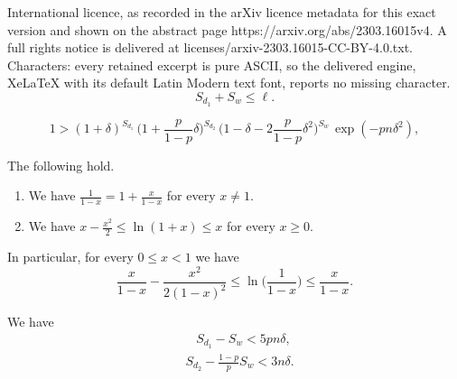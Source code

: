 \documentclass[10pt,a4paper]{amsart}
\newcommand{\meg}{\geqslant}
\newcommand{\mik}{\leqslant}
\begin{document}
International licence, as recorded in the arXiv licence metadata for this exact version and shown on the abstract page https://arxiv.org/abs/2303.16015v4. A full rights notice is delivered at licenses/arxiv-2303.16015-CC-BY-4.0.txt. Characters: every retained excerpt is pure ASCII, so the delivered engine, XeLaTeX with its default Latin Modern text font, reports no missing character.
\begin{equation} \label{e5.6}
S_{d_1}+S_w\mik \ell.
\end{equation}

\begin{equation} \label{e6.4}
1 >(1+\delta)^{S_{d_1}}\, \Big(1+\frac{p}{1-p}\delta\Big)^{S_{d_2}}\,
\Big(1-\delta-2\frac{p}{1-p}\delta^2\Big)^{S_w}\, \exp(-pn\delta^2),
\end{equation}

\begin{observation} \label{o6.2}
The following hold.
\begin{enumerate}
\item[(i)] \label{i} We have $\frac{1}{1-x}=1+\frac{x}{1-x}$ for every $x\neq 1$.
\item[(ii)] \label{ii} We have $x-\frac{x^2}{2}\mik\ln(1+x)\mik x$ for every $x\meg 0$.
\end{enumerate}
In particular, for every $0\mik x <1$ we have
\begin{equation} \label{en.6.1}
\frac{x}{1-x} -\frac{x^2}{2(1-x)^2} \mik \ln\Big(\frac{1}{1-x}\Big) \mik \frac{x}{1-x}.
\end{equation}
\end{observation}

\begin{lem} \label{l6.1}
We have
\begin{align}
\label{e6.5} & \ \ \ \, S_{d_1}-S_w < 5pn\delta, \\
\label{e6.6} & S_{d_2} -\frac{1-p}{p}S_w  < 3n \delta.
\end{align}
\end{lem}
\end{document}
